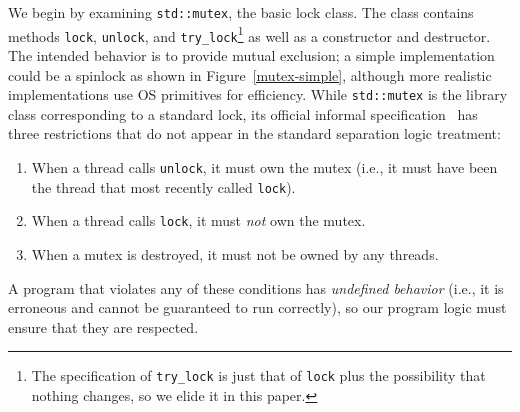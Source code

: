 We begin by examining \lstinline{std::mutex}, the basic lock class. The class contains methods \lstinline{lock}, \lstinline{unlock}, and \lstinline{try_lock}\footnote{The specification of \lstinline{try_lock} is just that of \lstinline{lock} plus the possibility that nothing changes, so we elide it in this paper.} as well as a constructor and destructor. The intended behavior is to provide mutual exclusion; a simple implementation could be a spinlock as shown in Figure~\ref{mutex-simple}, although more realistic implementations use OS primitives for efficiency. While \lstinline{std::mutex} is the library class corresponding to a standard lock, its official informal specification~\cite{ISO:2024:IIP} has three restrictions that do not appear in the standard separation logic treatment:
\begin{enumerate}
\item When a thread calls \lstinline{unlock}, it must own the mutex (i.e., it must have been the thread that most recently called \lstinline{lock}).
\item When a thread calls \lstinline{lock}, it must \emph{not} own the mutex.
\item When a mutex is destroyed, it must not be owned by any threads.
\end{enumerate}
A program that violates any of these conditions has \emph{undefined behavior} (i.e., it is erroneous and cannot be guaranteed to run correctly), so our program logic must ensure that they are respected.

